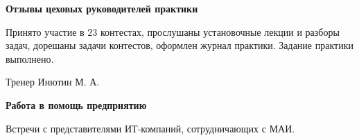 \begin{center}
\bfseries{\large Отзывы цеховых руководителей практики}
\end{center}

Принято участие в $23$ контестах, прослушаны установочные лекции и разборы задач, дорешаны задачи контестов, оформлен журнал практики. Задание практики выполнено.

\vspace{15pt}

\hfill Тренер Инютин М. А. 

\vspace{200pt}

\begin{center}
\bfseries{\large Работа в помощь предприятию}
\end{center}

Встречи с представителями ИТ-компаний, сотрудничающих с МАИ.

\pagebreak
